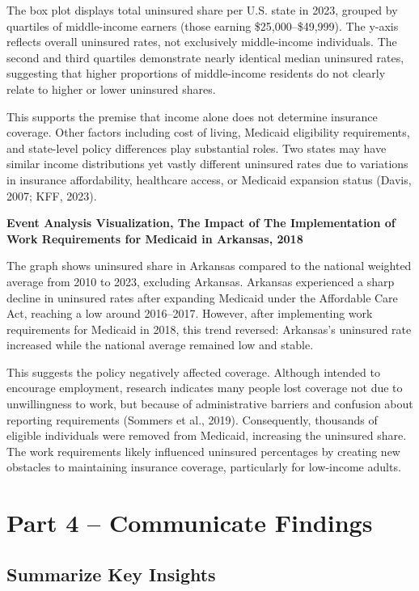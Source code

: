 \documentclass[
]{article}
\begin{document}
The box plot displays total uninsured share per U.S. state in 2023,
grouped by quartiles of middle-income earners (those earning
\$25,000--\$49,999). The y-axis reflects overall uninsured rates, not
exclusively middle-income individuals. The second and third quartiles
demonstrate nearly identical median uninsured rates, suggesting that
higher proportions of middle-income residents do not clearly relate to
higher or lower uninsured shares.

This supports the premise that income alone does not determine insurance
coverage. Other factors including cost of living, Medicaid eligibility
requirements, and state-level policy differences play substantial roles.
Two states may have similar income distributions yet vastly different
uninsured rates due to variations in insurance affordability, healthcare
access, or Medicaid expansion status (Davis, 2007; KFF, 2023).

\textbf{Event Analysis Visualization, The Impact of The Implementation
of Work Requirements for Medicaid in Arkansas, 2018}

The graph shows uninsured share in Arkansas compared to the national
weighted average from 2010 to 2023, excluding Arkansas. Arkansas
experienced a sharp decline in uninsured rates after expanding Medicaid
under the Affordable Care Act, reaching a low around 2016--2017.
However, after implementing work requirements for Medicaid in 2018, this
trend reversed: Arkansas's uninsured rate increased while the national
average remained low and stable.

This suggests the policy negatively affected coverage. Although intended
to encourage employment, research indicates many people lost coverage
not due to unwillingness to work, but because of administrative barriers
and confusion about reporting requirements (Sommers et al., 2019).
Consequently, thousands of eligible individuals were removed from
Medicaid, increasing the uninsured share. The work requirements likely
influenced uninsured percentages by creating new obstacles to
maintaining insurance coverage, particularly for low-income adults.

\section{Part 4 -- Communicate
Findings}\label{part-4-communicate-findings}

\subsection{Summarize Key Insights}\label{summarize-key-insights}
\end{document}
